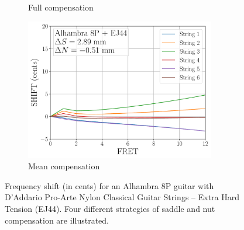 \begin{figure}
\begin{subfigure}[b]{0.45\textwidth}
   \caption{Full compensation}
   \label{fig:shift_alhambra8p_ej44_full}
  \end{subfigure}
  \hspace{0.25in}
  \begin{subfigure}[b]{0.45\textwidth}
   \centering
   \includegraphics[width=3.25in]{figures/shift_alhambra8p_ej44_mean}
   \caption{Mean compensation}
   \label{fig:shift_alhambra8p_ej44_mean}
  \end{subfigure}
  \caption{\label{fig:compensation_alhambra8p_ej44} Frequency shift (in cents) for an Alhambra 8P guitar with D'Addario Pro-Arte Nylon Classical Guitar Strings -- Extra Hard Tension (EJ44). Four different strategies of saddle and nut compensation are illustrated.}
 \end{figure}
